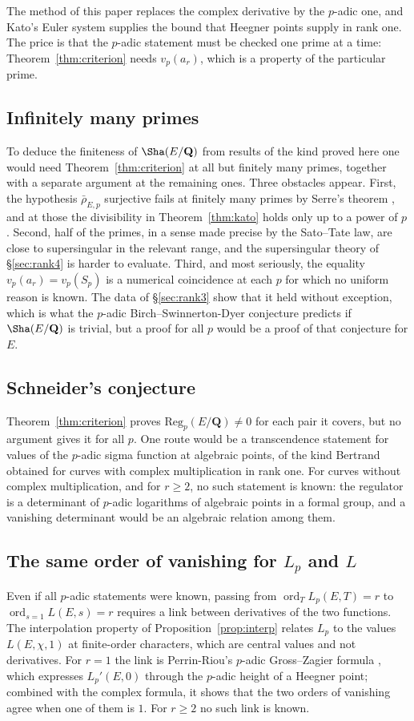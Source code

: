 \documentclass[11pt]{amsart}
\theoremstyle{definition}
\newcommand{\Q}{\mathbf{Q}}
\newcommand{\Reg}{\mathrm{Reg}}
\newcommand{\ord}{\operatorname{ord}}
\newcommand{\rhobar}{\bar\rho_{E,p}}
\begin{document}
The method of this paper replaces the complex derivative by the $p$-adic one, and Kato's Euler system supplies the bound that Heegner points supply in rank one. The price is that the $p$-adic statement must be checked one prime at a time: Theorem~\ref{thm:criterion} needs $v_p(a_r)$, which is a property of the particular prime.

\subsection{Infinitely many primes}
To deduce the finiteness of $\Sha(E/\Q)$ from results of the kind proved here one would need Theorem~\ref{thm:criterion} at all but finitely many primes, together with a separate argument at the remaining ones. Three obstacles appear. First, the hypothesis $\rhobar$ surjective fails at finitely many primes by Serre's theorem \cite{Ser72}, and at those the divisibility in Theorem~\ref{thm:kato} holds only up to a power of $p$. Second, half of the primes, in a sense made precise by the Sato--Tate law, are close to supersingular in the relevant range, and the supersingular theory of \S\ref{sec:rank4} is harder to evaluate. Third, and most seriously, the equality $v_p(a_r)=v_p(S_p)$ is a numerical coincidence at each $p$ for which no uniform reason is known. The data of \S\ref{sec:rank3} show that it held without exception, which is what the $p$-adic Birch--Swinnerton-Dyer conjecture predicts if $\Sha(E/\Q)$ is trivial, but a proof for all $p$ would be a proof of that conjecture for $E$.

\subsection{Schneider's conjecture}
Theorem~\ref{thm:criterion} proves $\Reg_p(E/\Q)\ne0$ for each pair it covers, but no argument gives it for all $p$. One route would be a transcendence statement for values of the $p$-adic sigma function at algebraic points, of the kind Bertrand obtained for curves with complex multiplication in rank one. For curves without complex multiplication, and for $r\ge2$, no such statement is known: the regulator is a determinant of $p$-adic logarithms of algebraic points in a formal group, and a vanishing determinant would be an algebraic relation among them.

\subsection{The same order of vanishing for \texorpdfstring{$L_p$}{Lp} and \texorpdfstring{$L$}{L}}
Even if all $p$-adic statements were known, passing from $\ord_TL_p(E,T)=r$ to $\ord_{s=1}L(E,s)=r$ requires a link between derivatives of the two functions. The interpolation property of Proposition~\ref{prop:interp} relates $L_p$ to the values $L(E,\chi,1)$ at finite-order characters, which are central values and not derivatives. For $r=1$ the link is Perrin-Riou's $p$-adic Gross--Zagier formula \cite{PR87}, which expresses $L_p'(E,0)$ through the $p$-adic height of a Heegner point; combined with the complex formula, it shows that the two orders of vanishing agree when one of them is $1$. For $r\ge2$ no such link is known.
\end{document}
